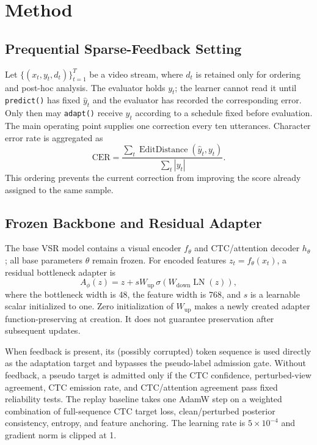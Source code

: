 \section{Method}
\label{sec:method}

\subsection{Prequential Sparse-Feedback Setting}

Let $\{(x_t,y_t,d_t)\}_{t=1}^{T}$ be a video stream, where $d_t$ is retained only for ordering and post-hoc analysis. The evaluator holds $y_t$; the learner cannot read it until \texttt{predict()} has fixed $\hat y_t$ and the evaluator has recorded the corresponding error. Only then may \texttt{adapt()} receive $y_t$ according to a schedule fixed before evaluation. The main operating point supplies one correction every ten utterances. Character error rate is aggregated as
\begin{equation}
  \mathrm{CER}=\frac{\sum_t \operatorname{EditDistance}(\hat y_t,y_t)}{\sum_t |y_t|}.
\end{equation}
This ordering prevents the current correction from improving the score already assigned to the same sample.

\subsection{Frozen Backbone and Residual Adapter}

The base VSR model contains a visual encoder $f_{\theta}$ and CTC/attention decoder $h_{\theta}$; all base parameters $\theta$ remain frozen. For encoded features $z_t=f_{\theta}(x_t)$, a residual bottleneck adapter is
\begin{equation}
  A_{\phi}(z)=z+sW_{\mathrm{up}}\,\sigma\!\left(W_{\mathrm{down}}\operatorname{LN}(z)\right),
\end{equation}
where the bottleneck width is 48, the feature width is 768, and $s$ is a learnable scalar initialized to one. Zero initialization of $W_{\mathrm{up}}$ makes a newly created adapter function-preserving at creation. It does not guarantee preservation after subsequent updates.

When feedback is present, its (possibly corrupted) token sequence is used directly as the adaptation target and bypasses the pseudo-label admission gate. Without feedback, a pseudo target is admitted only if the CTC confidence, perturbed-view agreement, CTC emission rate, and CTC/attention agreement pass fixed reliability tests. The replay baseline takes one AdamW step on a weighted combination of full-sequence CTC target loss, clean/perturbed posterior consistency, entropy, and feature anchoring. The learning rate is $5\times10^{-4}$ and gradient norm is clipped at 1.

